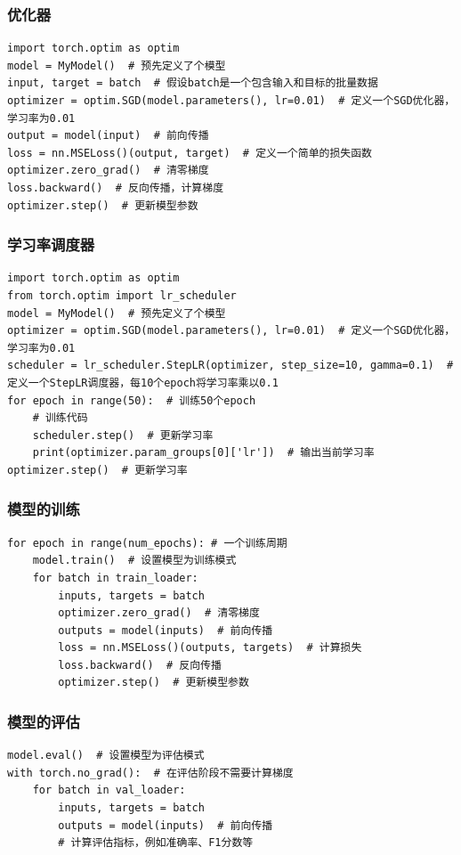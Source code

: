 \documentclass{ctexbeamer}
\begin{document}
\begin{frame}[fragile]
    \frametitle{优化器}

    \begin{verbatim}
import torch.optim as optim
model = MyModel()  # 预先定义了个模型
input, target = batch  # 假设batch是一个包含输入和目标的批量数据
optimizer = optim.SGD(model.parameters(), lr=0.01)  # 定义一个SGD优化器，学习率为0.01
output = model(input)  # 前向传播
loss = nn.MSELoss()(output, target)  # 定义一个简单的损失函数
optimizer.zero_grad()  # 清零梯度
loss.backward()  # 反向传播，计算梯度
optimizer.step()  # 更新模型参数
    \end{verbatim}

\end{frame}

\begin{frame}[fragile]
    \frametitle{学习率调度器}

    \begin{verbatim}
import torch.optim as optim
from torch.optim import lr_scheduler
model = MyModel()  # 预先定义了个模型
optimizer = optim.SGD(model.parameters(), lr=0.01)  # 定义一个SGD优化器，学习率为0.01
scheduler = lr_scheduler.StepLR(optimizer, step_size=10, gamma=0.1)  # 定义一个StepLR调度器，每10个epoch将学习率乘以0.1
for epoch in range(50):  # 训练50个epoch
    # 训练代码
    scheduler.step()  # 更新学习率
    print(optimizer.param_groups[0]['lr'])  # 输出当前学习率
optimizer.step()  # 更新学习率
    \end{verbatim}


\end{frame}

\begin{frame}[fragile]
    \frametitle{模型的训练}

    \begin{verbatim}
for epoch in range(num_epochs): # 一个训练周期
    model.train()  # 设置模型为训练模式
    for batch in train_loader:
        inputs, targets = batch
        optimizer.zero_grad()  # 清零梯度
        outputs = model(inputs)  # 前向传播
        loss = nn.MSELoss()(outputs, targets)  # 计算损失
        loss.backward()  # 反向传播
        optimizer.step()  # 更新模型参数
    \end{verbatim}

\end{frame}

\begin{frame}[fragile]
    \frametitle{模型的评估}

    \begin{verbatim}
model.eval()  # 设置模型为评估模式
with torch.no_grad():  # 在评估阶段不需要计算梯度
    for batch in val_loader:
        inputs, targets = batch
        outputs = model(inputs)  # 前向传播
        # 计算评估指标，例如准确率、F1分数等
    \end{verbatim}

\end{frame}
\end{document}
